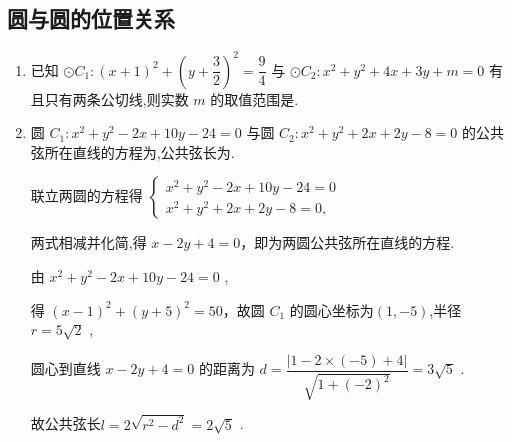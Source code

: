 \subsection*{圆与圆的位置关系}
\begin{enumerate}
    \item 已知 $\odot C_1 : \left( x + 1\right)^2 + \left( y + \dfrac{3}{2}\right)^2 = \dfrac{9}{4}$ 与 $\odot C_2 : x^2 + y^2 + 4x + 3y + m = 0$ 有且只有两条公切线,则实数 $m$ 的取值范围是.
    \item 圆 ${C}_{1} : {x}^{2} + {y}^{2} - {2x} + {10y} - {24} = 0$ 与圆 ${C}_{2} : {x}^{2} + {y}^{2} + {2x} + {2y} - 8 = 0$ 的公共弦所在直线的方程为,公共弦长为.
    \begin{jieda}
        联立两圆的方程得 $\left\{  \begin{array}{l} {x}^{2} + {y}^{2} - {2x} + {10y} - {24} = 0 \\  {x}^{2} + {y}^{2} + {2x} + {2y} - 8 = 0, \end{array}\right.$
        
        两式相减并化简,得 $x - {2y} + 4 = 0$，即为两圆公共弦所在直线的方程.
        
        由 ${x}^{2} + {y}^{2} - {2x} + {10y} - {24} = 0$ ,
        
        得 ${\left( x - 1\right) }^{2} + {\left( y + 5\right) }^{2} = {50}$，故圆 ${C}_{1}$ 的圆心坐标为$(1, -5)$,半径 $r = 5\sqrt{2}$ ,
        
        圆心到直线 $x - {2y} + 4 = 0$ 的距离为 $d = \dfrac{\left| 1 - 2 \times  \left( -5\right)  + 4\right| }{\sqrt{1 + {\left( -2\right) }^{2}}} = 3\sqrt{5}$ .
        
        故公共弦长$l = 2\sqrt{r^2-d^2} = 2\sqrt{5}$ .
    \end{jieda}
\end{enumerate}
